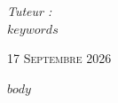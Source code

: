 \documentclass[a4paper,12pt]{article}
\begin{document}
\begin{titlepage}
\begin{minipage}{0.87\textwidth}
\vspace{-4.3cm}

\begin{flushright}

\textit{Tuteur :}\\[0.2cm]

\textsc{$keywords$}

\end{flushright}

\end{minipage}


\vfill

\begin{center}

\textsc{17 Septembre 2026}

\end{center}

\end{titlepage}


\clearpage

\renewcommand{\contentsname}{Table des matières}

\tableofcontents


\clearpage

$body$
\end{document}
